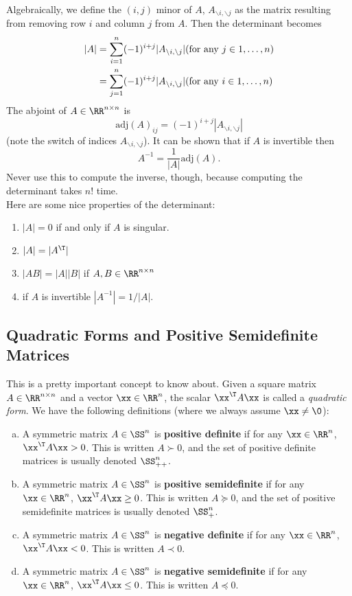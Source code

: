 \documentclass{article}
\begin{document}
Algebraically, we define the $(i,j)$ minor of $A$, $A_{\backslash i, \backslash j}$
as the matrix resulting from removing row $i$ and column $j$ from $A$. Then the
determinant becomes
\begin{align*}
    |A| &= \sum_{i=1}^n (-1)^{i+j}|A_{\backslash i,\backslash j}| \hfill \text{(for any $j\in 1,\dots,n$)}\\
        &= \sum_{j=1}^n (-1)^{i+j}|A_{\backslash i,\backslash j}| \hfill \text{(for any $i\in 1,\dots,n$)}\\
\end{align*}
The abjoint of $A\in\RR^{n\times n}$ is
\[
    \mathrm{adj}(A)_{ij} = (-1)^{i+j}|A_{\backslash i,\backslash j}|
\]
(note the switch of indices $A_{\backslash i,\backslash j}$). It can be shown that if $A$ is invertible
then
\[
    A^{-1} = \frac{1}{|A|}\mathrm{adj}(A).
\]
Never use this to compute the inverse, though, because computing the determinant takes
$n!$ time.\\

Here are some nice properties of the determinant:
\begin{enumerate}
    \item $|A|=0$ if and only if $A$ is singular.
    \item $|A|=|A^\T|$
    \item $|AB|=|A||B|$ if $A,B\in\RR^{n\times n}$
    \item if $A$ is invertible $|A^{-1}| = 1/|A|$.
\end{enumerate}

\subsection{Quadratic Forms and Positive Semidefinite Matrices}

This is a pretty important concept to know about. Given a square matrix $A\in\RR^{n\times n}$
and a vector $\xx\in\RR^n$, the scalar $\xx^\T A\xx$ is called a
\textit{quadratic form}. We have the following definitions (where we
always assume $\xx \neq \0$):
\begin{enumerate}[(a)]
    \item A symmetric matrix $A\in\SS^n$ is \textbf{positive definite}
        if for any $\xx\in\RR^n$, $\xx^\T A\xx > 0$. This is written
        $A \succ 0$, and the set of positive definite matrices is
        usually denoted $\SS_{++}^n$.
    \item A symmetric matrix $A\in\SS^n$ is \textbf{positive semidefinite}
        if for any $\xx\in\RR^n$, $\xx^\T A\xx \geq 0$. This is written
        $A \succeq 0$, and the set of positive semidefinite matrices is
        usually denoted $\SS_{+}^n$.
    \item A symmetric matrix $A\in\SS^n$ is \textbf{negative definite}
        if for any $\xx\in\RR^n$, $\xx^\T A\xx < 0$. This is written
        $A \prec 0$.
    \item A symmetric matrix $A\in\SS^n$ is \textbf{negative semidefinite}
        if for any $\xx\in\RR^n$, $\xx^\T A\xx \leq 0$. This is written
        $A \preceq 0$.
\end{enumerate}
\end{document}
